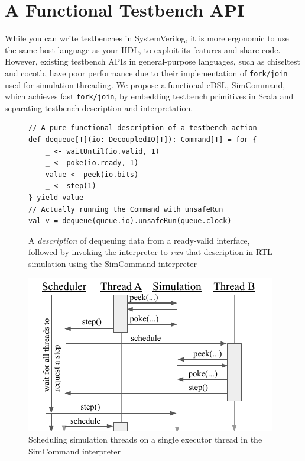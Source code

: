 \documentclass[sigplan,review,nonacm,9pt]{acmart}
\begin{document}
\section{A Functional Testbench API}

While you can write testbenches in SystemVerilog, it is more ergonomic to use the same host language as your HDL, to exploit its features and share code.
However, existing testbench APIs in general-purpose languages, such as chiseltest\cite{chiseltest} and cocotb\cite{cocotb}, have poor performance due to their implementation of \texttt{fork/join} used for simulation threading.
We propose a functional eDSL, SimCommand\cite{simcommand}, which achieves fast \texttt{fork/join}, by embedding testbench primitives in Scala and separating testbench description and interpretation.

\begin{figure}
\begin{verbatim}
// A pure functional description of a testbench action
def dequeue[T](io: DecoupledIO[T]): Command[T] = for {
    _ <- waitUntil(io.valid, 1)
    _ <- poke(io.ready, 1)
    value <- peek(io.bits)
    _ <- step(1)
} yield value
// Actually running the Command with unsafeRun
val v = dequeue(queue.io).unsafeRun(queue.clock)
\end{verbatim}
\caption{A \textit{description} of dequeuing data from a ready-valid interface, followed by invoking the interpreter to \textit{run} that description in RTL simulation using the SimCommand interpreter}
\label{fig:simcommand}
\end{figure}

\begin{figure}
\includegraphics[scale=1]{simcommand/scheduler.pdf}
\caption{Scheduling simulation threads on a single executor thread in the SimCommand interpreter}
\label{fig:simcommand_interp}
\end{figure}
\end{document}
